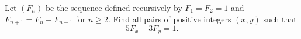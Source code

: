 Let $(F_n)$ be the sequence defined recursively by $F_1=F_2=1$ and $F_{n+1}=F_n+F_{n-1}$ for $n\geq 2$. Find all pairs of positive integers $(x,y)$ such that$$5F_x-3F_y=1.$$